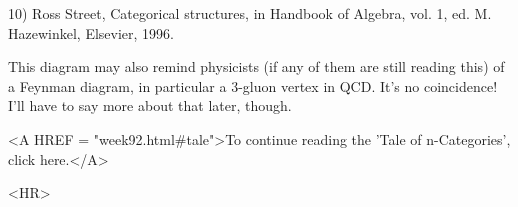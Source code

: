 10) Ross Street, Categorical structures, in Handbook of Algebra, vol. 1,
ed. M. Hazewinkel, Elsevier, 1996.

This diagram may also remind physicists (if any of them are still
reading this) of a Feynman diagram, in particular a 3-gluon vertex in
QCD.  It's no coincidence!  I'll have to say more about that later,
though.

<A HREF = "week92.html#tale">To continue reading the 'Tale of
n-Categories', click here.</A>

<HR>



